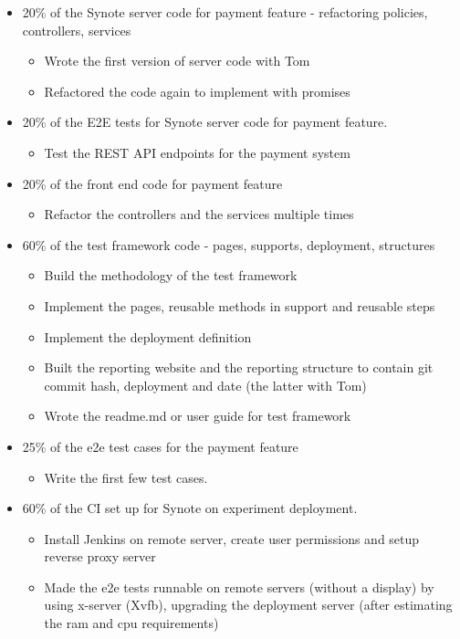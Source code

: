 \begin{itemize}
 \item 20\% of the Synote server code for payment feature - refactoring policies, controllers, services
 \begin{itemize}
  \item Wrote the first version of server code with Tom
  \item Refactored the code again to implement with promises
 \end{itemize}
 \item 20\% of the E2E tests for Synote server code for
  payment feature.
 \begin{itemize}
  \item Test the REST API endpoints for the payment system
 \end{itemize}
 \item 20\% of the front end code for payment feature
 \begin{itemize}
  \item Refactor the controllers and the services multiple times
 \end{itemize}
 \item 60\% of the test framework code - pages, supports, deployment, structures
 \begin{itemize}
  \item Build the methodology of the test framework
  \item Implement the pages, reusable methods in support and reusable steps
  \item Implement the deployment definition
  \item Built the reporting website and the reporting structure to contain git commit hash, deployment and date (the latter with Tom)
  \item Wrote the readme.md or user guide for test framework
 \end{itemize}
 \item 25\% of the e2e test cases for the payment feature
 \begin{itemize}
  \item Write the first few test cases.
 \end{itemize}
 \item 60\% of the CI set up for Synote on experiment deployment.
 \begin{itemize}
  \item Install Jenkins on remote server, create user permissions and setup reverse proxy server
  \item Made the e2e tests runnable on remote servers (without a display) by using x-server (Xvfb), upgrading the deployment server (after estimating the ram and cpu requirements)

\end{itemize}
\end{itemize}
